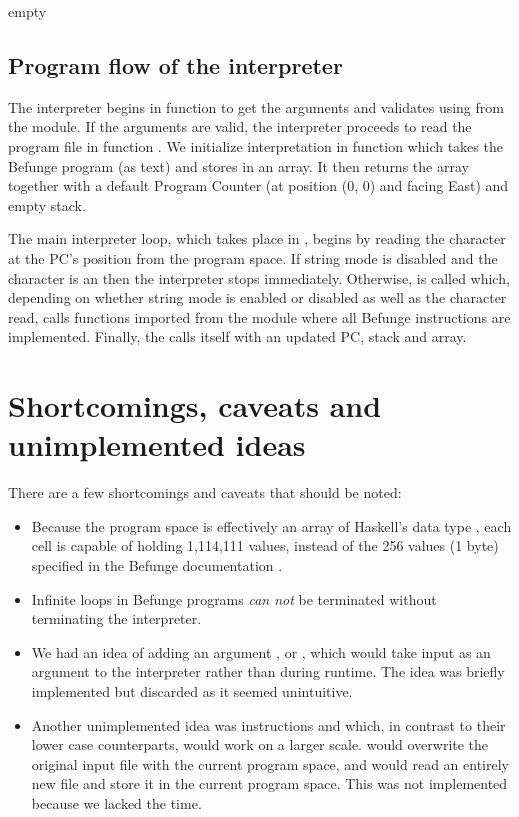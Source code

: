 \documentclass[12pt, a4paper]{article}
\begin{document}
empty

\subsection{Program flow of the interpreter}
\label{sec:interpreterflow}

The interpreter begins in function  to get the arguments and validates using  from the  module. If the arguments are valid, the interpreter proceeds to read the program file in function . We initialize interpretation in function  which takes the Befunge program (as text) and stores in an array. It then returns the array together with a default Program Counter (at position (0, 0) and facing East) and empty stack.

The main interpreter loop, which takes place in , begins by reading the character at the PC's position from the program space. If string mode is disabled and the character is an  then the interpreter stops immediately. Otherwise,  is called which, depending on whether string mode is enabled or disabled as well as the character read, calls functions imported from the module  where all Befunge instructions are implemented. Finally, the  calls itself with an updated PC, stack and array.

\section{Shortcomings, caveats and unimplemented ideas}



There are a few shortcomings and caveats that should be noted:

\begin{itemize}

\item Because the program space is effectively an array of Haskell's data type , each cell is capable of holding 1,114,111 values, instead of the 256 values (1 byte) specified in the Befunge documentation \cite{befunge93}.

\item Infinite loops in Befunge programs \emph{can not} be terminated without terminating the interpreter.

\item We had an idea of adding an argument , or , which would take input as an argument to the interpreter rather than during runtime. The idea was briefly implemented but discarded as it seemed unintuitive.

\item Another unimplemented idea was instructions  and  which, in contrast to their lower case counterparts, would work on a larger scale.  would overwrite the original input file with the current program space, and  would read an entirely new file and store it in the current program space. This was not implemented because we lacked the time.

\end{itemize}

\vfill



\end{document}
